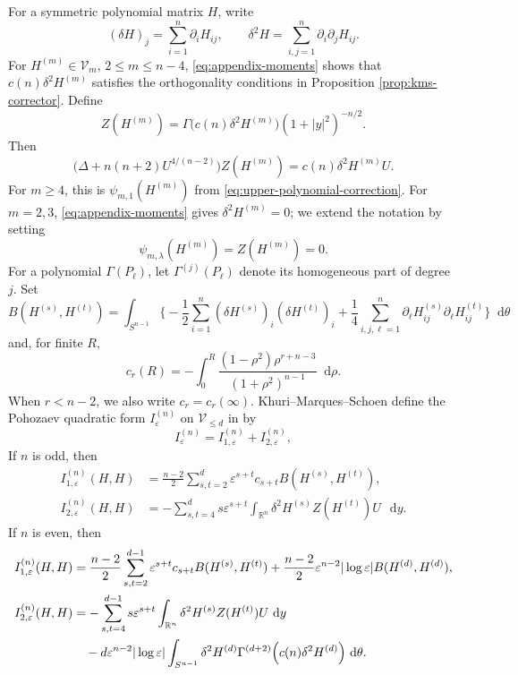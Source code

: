 \documentclass[11pt]{article}
\numberwithin{equation}{section}
\theoremstyle{remark}
\newcommand{\R}{\mathbb R}
\newcommand{\Sph}{S}
\newcommand{\dd}{\mathop{}\!\mathrm{d}}
\begin{document}
For a symmetric polynomial matrix \(H\), write
{
\[
 (\delta H)_j=\sum_{i=1}^n\partial_iH_{ij},\qquad
 \delta^2H=\sum_{i,j=1}^n\partial_i\partial_jH_{ij}.
\]
}
For \(H^{(m)}\in\mathcal V_m\), \(2\le m\le n-4\),
\eqref{eq:appendix-moments} shows that
\(c(n)\delta^2H^{(m)}\) satisfies the orthogonality conditions in
Proposition  \ref{prop:kms-corrector}. Define
{
\[
 Z(H^{(m)})
 =\Gamma\bigl(c(n)\delta^2H^{(m)}\bigr)(1+|y|^2)^{-n/2}.
\]
}
Then
{
\[
 \bigl(\Delta+n(n+2)U^{4/(n-2)}\bigr) Z(H^{(m)})
 =c(n)\delta^2H^{(m)}U.
\]
}
For \(m\ge4\), this is \(\psi_{m,1}(H^{(m)})\) from
\eqref{eq:upper-polynomial-correction}. For \(m=2,3\),
\eqref{eq:appendix-moments} gives \(\delta^2H^{(m)}=0\); we extend the
notation by setting
\[
 \psi_{m,\lambda}(H^{(m)})=Z(H^{(m)})=0.
\]
For a polynomial \(\Gamma(P_\ell)\), let
\(\Gamma^{(j)}(P_\ell)\) denote its homogeneous part of degree \(j\).
Set
{
\begin{equation*}
 B(H^{(s)},H^{(t)})
 =\int_{\Sph^{n-1}}
 \Biggl\{-\frac12\sum_{i=1}^n
                   (\delta H^{(s)})_i(\delta H^{(t)})_i
        +\frac14\sum_{i,j,\ell=1}^n
                   \partial_\ell H_{ij}^{(s)}
                   \partial_\ell H_{ij}^{(t)}\Biggr\}\dd\theta
\end{equation*}
}
 and, for finite $R$,
{
\begin{equation}\label{eq:truncated-radial-coefficient}
 c_r(R)=-\int_0^R
 \frac{(1-\rho^2)\rho^{r+n-3}}
      {(1+\rho^2)^{n-1}}\dd\rho.
\end{equation}
}
 When $r<n-2$, we also write $c_r=c_r(\infty)$.
Khuri--Marques--Schoen define the Pohozaev quadratic form
$I_\varepsilon^{(n)}$ on $\mathcal V_{\le d}$ in
\cite[Appendix  A]{KMS} by
{
\begin{equation}\label{eq:kms-pohozaev-form}
 I_\varepsilon^{(n)}
 =I_{1,\varepsilon}^{(n)}+I_{2,\varepsilon}^{(n)},
\end{equation}
}
{
If \(n\) is odd, then
\[
\begin{aligned}
 I_{1,\varepsilon}^{(n)}(H,H)
 &=\frac{n-2}{2}\sum_{s,t=2}^d
 \varepsilon^{s+t}c_{s+t}B(H^{(s)},H^{(t)}),\\
 I_{2,\varepsilon}^{(n)}(H,H)
 &=-\sum_{s,t=4}^d s\varepsilon^{s+t}
 \int_{\R^n}
 \delta^2H^{(s)}Z(H^{(t)})U\,\dd y.
\end{aligned}
\]
If \(n\) is even, then
\[
\begin{aligned}
 I_{1,\varepsilon}^{(n)}(H,H)
 &=\frac{n-2}{2}\sum_{s,t=2}^{d-1}
 \varepsilon^{s+t}c_{s+t}B(H^{(s)},H^{(t)})
 +\frac{n-2}{2}\varepsilon^{n-2}|\log\varepsilon|
 B(H^{(d)},H^{(d)}),\\
 I_{2,\varepsilon}^{(n)}(H,H)
 &=-\sum_{s,t=4}^{d-1}s\varepsilon^{s+t}
 \int_{\R^n}
 \delta^2H^{(s)}Z(H^{(t)})U\,\dd y\\
 &\quad-d\varepsilon^{n-2}|\log\varepsilon|
 \int_{\Sph^{n-1}}
 \delta^2H^{(d)}
 \Gamma^{(d+2)}\Bigl(
 c(n)\delta^2H^{(d)}\Bigr)\,\dd\theta.
\end{aligned}
\]
}
\end{document}
